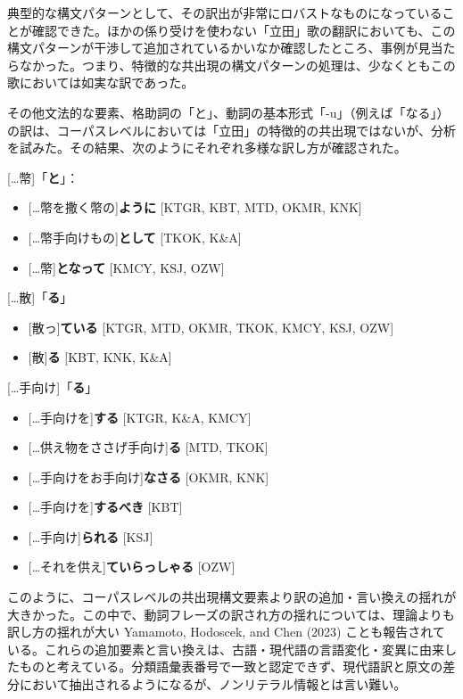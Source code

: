 \documentclass[
  letterpaper,
  DIV=11,
  numbers=noendperiod]{scrartcl}
\providecommand{\tightlist}{%
  \setlength{\itemsep}{0pt}\setlength{\parskip}{0pt}}\usepackage{longtable,booktabs,array}
\begin{document}
典型的な構文パターンとして、その訳出が非常にロバストなものになっていることが確認できた。ほかの係り受けを使わない「立田」歌の翻訳においても、この構文パターンが干渉して追加されているかいなか確認したところ、事例が見当たらなかった。つまり、特徴的な共出現の構文パターンの処理は、少なくともこの歌においては如実な訳であった。

その他文法的な要素、格助詞の「と」、動詞の基本形式「-u」（例えば「なる」）の訳は、コーパスレベルにおいては「立田」の特徴的の共出現ではないが、分析を試みた。その結果、次のようにそれぞれ多様な訳し方が確認された。

{[}\ldots 幣{]}「\textbf{と}」：

\begin{itemize}
\tightlist
\item
  {[}\ldots 幣を撒く\textbar 幣の{]}\textbf{ように} {[}KTGR, KBT, MTD,
  OKMR, KNK{]}
\item
  {[}\ldots 幣\textbar 手向けもの{]}\textbf{として} {[}TKOK, K\&A{]}
\item
  {[}\ldots 幣{]}\textbf{となって} {[}KMCY, KSJ, OZW{]}
\end{itemize}

{[}\ldots 散{]}「\textbf{る}」

\begin{itemize}
\tightlist
\item
  {[}散っ{]}\textbf{ている} {[}KTGR, MTD, OKMR, TKOK, KMCY, KSJ, OZW{]}
\item
  {[}散{]}\textbf{る} {[}KBT, KNK, K\&A{]}
\end{itemize}

{[}\ldots 手向け{]}「\textbf{る}」

\begin{itemize}
\tightlist
\item
  {[}\ldots 手向けを{]}\textbf{する} {[}KTGR, K\&A, KMCY{]}
\item
  {[}\ldots 供え物をささげ\textbar 手向け{]}\textbf{る} {[}MTD, TKOK{]}
\item
  {[}\ldots 手向けを\textbar お手向け{]}\textbf{なさる} {[}OKMR, KNK{]}
\item
  {[}\ldots 手向けを{]}\textbf{するべき} {[}KBT{]}
\item
  {[}\ldots 手向け{]}\textbf{られる} {[}KSJ{]}
\item
  {[}\ldots それを供え{]}\textbf{ていらっしゃる} {[}OZW{]}
\end{itemize}

このように、コーパスレベルの共出現構文要素より訳の追加・言い換えの揺れが大きかった。この中で、動詞フレーズの訳され方の揺れについては、理論よりも訳し方の揺れが大い
Yamamoto, Hodoscek, and Chen (2023)
ことも報告されている。これらの追加要素と言い換えは、古語・現代語の言語変化・変異に由来したものと考えている。分類語彙表番号で一致と認定できず、現代語訳と原文の差分において抽出されるようになるが、ノンリテラル情報とは言い難い。
\end{document}
